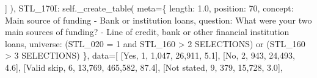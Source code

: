 \documentclass[
  11pt,
  a4paper,
]{article}
\newenvironment{Shaded}{\begin{snugshade}}{\end{snugshade}}
\newcommand{\NormalTok}[1]{\textcolor[rgb]{0.00,0.23,0.31}{#1}}
\newcommand{\OperatorTok}[1]{\textcolor[rgb]{0.37,0.37,0.37}{#1}}
\newcommand{\StringTok}[1]{\textcolor[rgb]{0.13,0.47,0.30}{#1}}
\newcommand{\VariableTok}[1]{\textcolor[rgb]{0.07,0.07,0.07}{#1}}
\begin{document}
\begin{Shaded}
\begin{Highlighting}[]
\NormalTok{                ]}
\NormalTok{            ),}
            \StringTok{\textquotesingle{}STL\_170I\textquotesingle{}}\NormalTok{: }\VariableTok{self}\NormalTok{.\_create\_table(}
\NormalTok{                meta}\OperatorTok{=}\NormalTok{\{}
                    \StringTok{\textquotesingle{}length\textquotesingle{}}\NormalTok{: }\StringTok{\textquotesingle{}1.0\textquotesingle{}}\NormalTok{, }\StringTok{\textquotesingle{}position\textquotesingle{}}\NormalTok{: }\StringTok{\textquotesingle{}70\textquotesingle{}}\NormalTok{,}
                    \StringTok{\textquotesingle{}concept\textquotesingle{}}\NormalTok{: }\StringTok{\textquotesingle{}Main source of funding {-} Bank or institution loans\textquotesingle{}}\NormalTok{,}
                    \StringTok{\textquotesingle{}question\textquotesingle{}}\NormalTok{: }\StringTok{\textquotesingle{}What were your two main sources of funding? {-} Line of credit, bank or other financial institution loans\textquotesingle{}}\NormalTok{,}
                    \StringTok{\textquotesingle{}universe\textquotesingle{}}\NormalTok{: }\StringTok{\textquotesingle{}(STL\_020 = 1 and STL\_160 \textgreater{} 2 SELECTIONS) or (STL\_160 \textgreater{} 3 SELECTIONS)\textquotesingle{}}
\NormalTok{                \},}
\NormalTok{                data}\OperatorTok{=}\NormalTok{[}
\NormalTok{                    [}\StringTok{\textquotesingle{}Yes\textquotesingle{}}\NormalTok{, }\StringTok{\textquotesingle{}1\textquotesingle{}}\NormalTok{, }\StringTok{\textquotesingle{}1,047\textquotesingle{}}\NormalTok{, }\StringTok{\textquotesingle{}26,911\textquotesingle{}}\NormalTok{, }\StringTok{\textquotesingle{}5.1\textquotesingle{}}\NormalTok{],}
\NormalTok{                    [}\StringTok{\textquotesingle{}No\textquotesingle{}}\NormalTok{, }\StringTok{\textquotesingle{}2\textquotesingle{}}\NormalTok{, }\StringTok{\textquotesingle{}943\textquotesingle{}}\NormalTok{, }\StringTok{\textquotesingle{}24,493\textquotesingle{}}\NormalTok{, }\StringTok{\textquotesingle{}4.6\textquotesingle{}}\NormalTok{],}
\NormalTok{                    [}\StringTok{\textquotesingle{}Valid skip\textquotesingle{}}\NormalTok{, }\StringTok{\textquotesingle{}6\textquotesingle{}}\NormalTok{, }\StringTok{\textquotesingle{}13,769\textquotesingle{}}\NormalTok{, }\StringTok{\textquotesingle{}465,582\textquotesingle{}}\NormalTok{, }\StringTok{\textquotesingle{}87.4\textquotesingle{}}\NormalTok{],}
\NormalTok{                    [}\StringTok{\textquotesingle{}Not stated\textquotesingle{}}\NormalTok{, }\StringTok{\textquotesingle{}9\textquotesingle{}}\NormalTok{, }\StringTok{\textquotesingle{}379\textquotesingle{}}\NormalTok{, }\StringTok{\textquotesingle{}15,728\textquotesingle{}}\NormalTok{, }\StringTok{\textquotesingle{}3.0\textquotesingle{}}\NormalTok{],}

\end{Highlighting}
\end{Shaded}
\end{document}
